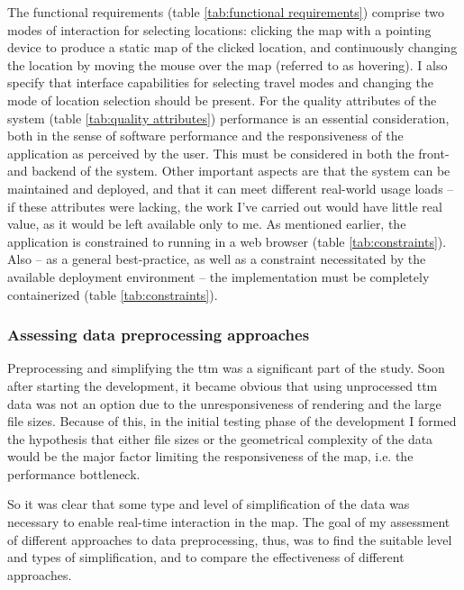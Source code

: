 The functional requirements (table \ref{tab:functional requirements})
comprise two modes of interaction for selecting locations:
clicking the map with a pointing device to produce a static map of the clicked location,
and continuously changing the location by moving the mouse over the map
(referred to as hovering).
I also specify that interface capabilities for selecting travel modes
and changing the mode of location selection should be present.
For the quality attributes of the system (table \ref{tab:quality attributes})
performance is an essential consideration,
both in the sense of software performance
and the responsiveness of the application as perceived by the user.
This must be considered in both the front- and backend of the system.
Other important aspects are that the system can be maintained and deployed,
and that it can meet different real-world usage loads --
if these attributes were lacking,
the work I've carried out would have little real value,
as it would be left available only to me.
As mentioned earlier,
the application is constrained to running in a web browser (table \ref{tab:constraints}).
Also -- as a general best-practice, as well as a constraint
necessitated by the available deployment environment --  %
the implementation must be completely containerized (table \ref{tab:constraints}).




\subsubsection{Assessing data preprocessing approaches}
Preprocessing and simplifying the \acrshort{ttm} was a significant part of the study.
Soon after starting the development,
it became obvious that using unprocessed \acrshort{ttm} data was not an option
due to the unresponsiveness of rendering and the large file sizes.
Because of this, in the initial testing phase of the development
I formed the hypothesis that either file sizes
or the geometrical complexity of the data would be
the major factor limiting the responsiveness of the map,
i.e. the performance bottleneck.

So it was clear that some type and level of simplification of the 
data was necessary to enable real-time interaction in the map.
The goal of my assessment of different approaches to data preprocessing, thus,
was to find the suitable level and types of simplification,
and to compare the effectiveness of different approaches.

